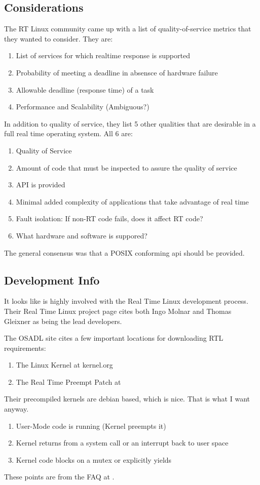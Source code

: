 \documentclass{article}
\begin{document}
\subsection{Considerations}
The RT Linux community came up with a list of quality-of-service metrics that they wanted to consider. \cite{RTLSummaryPost}  They are:
\begin{enumerate}
\item List of services for which realtime response is supported
\item Probability of meeting a deadline in absensce of hardware failure
\item Allowable deadline (response time) of a task
\item Performance and Scalability (Ambiguous?)
\end{enumerate}

In addition to quality of service, they list 5 other qualities that are desirable in a full real time operating system.  All 6 are:
\begin{enumerate}
\item Quality of Service
\item Amount of code that must be inspected to assure the quality of service
\item API is provided
\item Minimal added complexity of applications that take advantage of real time
\item Fault isolation: If non-RT code fails, does it affect RT code?
\item What hardware and software is suppored?
\end{enumerate}

The general consensus was that a POSIX conforming api should be provided.

\subsection{Development Info}
It looks like \cite{Osadl} is highly involved with the Real Time Linux development process.  Their Real Time Linux project page \cite{OsadlRealTimeLinux} cites both Ingo Molnar and Thomas Gleixner as being the lead developers.

The OSADL site cites a few important locations for downloading RTL requirements:
\begin{enumerate}
\item The Linux Kernel at kernel.org
\item The Real Time Preempt Patch at \cite{RealTimeLinuxPatch}
\end{enumerate}
Their precompiled kernels are debian based, which is nice.  That is what I want anyway.
\begin{enumerate}
\item User-Mode code is running (Kernel preempts it)
\item Kernel returns from a system call or an interrupt back to user space
\item Kernel code blocks on a mutex or explicitly yields
\end{enumerate}
These points are from the FAQ at \cite{RealTimeLinux}.
\end{document}
